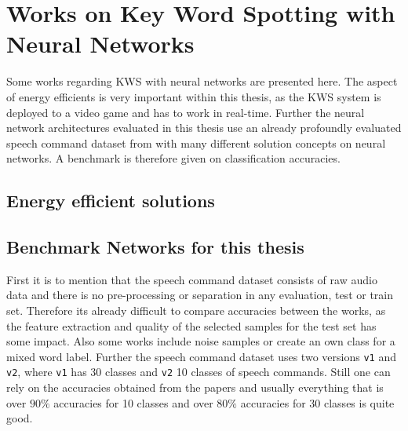 
\section{Works on Key Word Spotting with Neural Networks}\label{sec:prev_kws}
Some works regarding KWS with neural networks are presented here. 
The aspect of energy efficients is very important within this thesis, as the KWS system is deployed to a video game and has to work in real-time.
Further the neural network architectures evaluated in this thesis use an already profoundly evaluated speech command dataset from \cite{Warden2018} with many different solution concepts on neural networks. 
A benchmark is therefore given on classification accuracies.

\subsection{Energy efficient solutions}


\subsection{Benchmark Networks for this thesis}\label{sec:prev_kws_benchmark}
First it is to mention that the speech command dataset \cite{Warden2018} consists of raw audio data and there is no pre-processing or separation in any evaluation, test or train set. 
Therefore its already difficult to compare accuracies between the works, as the feature extraction and quality of the selected samples for the test set has some impact.
Also some works include noise samples or create an own class for a mixed word label.
Further the speech command dataset uses two versions \texttt{v1} and \texttt{v2}, where \texttt{v1} has 30 classes and \texttt{v2} 10 classes of speech commands.
Still one can rely on the accuracies obtained from the papers and usually everything that is over $90\%$ accuracies for 10 classes and over $80\%$ accuracies for 30 classes is quite good.



